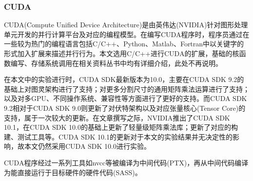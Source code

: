 \subsubsection{CUDA}
\par CUDA(Compute Unified Device Architecture)是由英伟达(NVIDIA)针对图形处理单元开发的并行计算平台及对应的编程模型。在编写CUDA程序时，程序员通过在一些较为热门的编程语言包括C/C++、Python、Matlab、Fortran中以关键字的形式加入扩展来描述并行行为。本文选用C/C++进行CUDA的扩展，基础的核函数编写、存储系统调用在相关资料丛书中均有详细介绍\cite{EVENEASIER}，此处不再说明。
\par 在本文中的实验进行时，CUDA SDK最新版本为10.0，主要在CUDA SDK 9.2的基础上对图灵架构进行了支持；对更多分割尺寸的通用矩阵乘法运算进行了支持\cite{10.0PATCH}；以及对多GPU、不同操作系统、兼容性等方面进行了更好的支持。而CUDA SDK 9.2相对于CUDA SDK 9.0则更新了对伏特架构以及对应张量核心(Tensor Core)的支持，属于一次较大的更新\cite{9.2PATCH}。在文章撰写之际，NVIDIA推出了CUDA SDK 10.1，在CUDA SDK 10.0的基础上更新了轻量级矩阵乘法库；更新了对应的构建、测试工具等\cite{10.1PATCH}。CUDA SDK 10.1的更新对于本文的实验结果并无决定性的影响，故本文仍然采用CUDA SDK 10.0进行实验。
\par CUDA程序经过一系列工具如nvcc等被编译为中间代码(PTX)，再从中间代码编译为能直接运行于目标硬件的硬件代码(SASS)。
